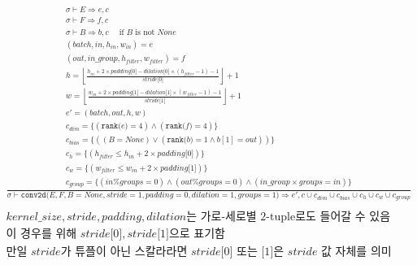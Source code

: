 \documentclass{article}
\newcommand{\x}{\times}
\newcommand{\rem}{\mtt{\%}}
\newcommand{\Rar}{\Rightarrow}
\newcommand{\mtt}[1]{\mathtt{#1}}
\newcommand{\bigspace}{\,\,\,\,\,\,\,\,}
\newcommand{\op}[2]{\mtt{#1(}#2\mtt{)}}
\newcommand{\ind}[1]{\mtt{[}#1\mtt{]}}
\begin{document}
\begin{align*}
  \frac
  {
    \begin{array}{l}
      \sigma \vdash E \Rar e, c \\
      \sigma \vdash F \Rar f, c \\
      \sigma \vdash B \Rar b, c \bigspace \text{if $B$ is not $None$} \\
      (batch, in, h_{in}, w_{in}) = e \\
      (out, in\_group, h_{filter}, w_{filter}) = f \\
      h = \left\lfloor \frac{h_{in} + 2 \x padding \ind{0} - dilation \ind{0}
        \x (h_{filter} - 1) - 1}{stride \ind{0}} \right\rfloor + 1 \\
      w = \left\lfloor \frac{w_{in} + 2 \x padding \ind{1} - dilation \ind{1}
        \x (w_{filter} - 1) - 1}{stride \ind{1}} \right\rfloor + 1 \\
      e' = (batch, out, h, w) \\
      c_{dim} = \{ (\op{rank}{e} = 4) \land (\op{rank}{f} = 4) \} \\
      c_{bias} = \{ ((B = None) \lor (\op{rank}{b} = 1 \land b[1] = out)) \} \\
      c_h = \{ (h_{filter} \leq h_{in} + 2 \x padding \ind{0}) \} \\
      c_w = \{ (w_{filter} \leq w_{in} + 2 \x padding \ind{1}) \} \\
      c_{group} = \{ (in \rem groups = 0) \land (out \rem groups = 0)
        \land (in\_group \x groups = in)\}
    \end{array}
  }
  {
    \sigma \vdash \op{conv2d}{E, F, B=None, stride=1, padding=0,
      dilation=1, groups=1} \Rar e', c \cup c_{dim} \cup c_{bias} \cup c_h \cup
      c_w \cup c_{group}
  } \\
  \\
  \text{$kernel\_size, stride, padding, dilation$는 가로-세로별 2-tuple로도 들어갈
  수 있음} \\
  \text{이 경우를 위해 $stride\ind{0}, stride\ind{1}$으로 표기함} \\
  \text{만일 $stride$가 튜플이 아닌 스칼라라면 $stride\ind{0}$ 또는 $\ind{1}$은
    $stride$ 값 자체를 의미}
\end{align*}%
\end{document}
